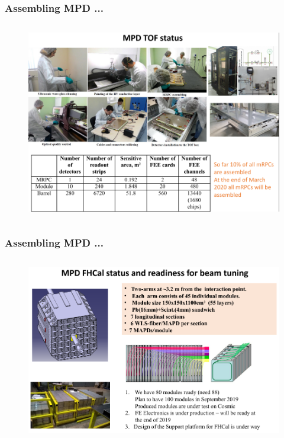 \documentclass[dvipsnames] {beamer}
\begin{document}
\begin{frame}
  \frametitle {\bf \centering Assembling MPD ...}
   \vskip -0.5cm
  \begin{columns}[t]
   \begin{block}{}
       \begin{figure}[H]
         \includegraphics[width=1.\textwidth]{MPD_tofFabrication.png}
       \end{figure}
   \end{block}
  \end{columns}
\end{frame}

\begin{frame}
  \frametitle {\bf \centering Assembling MPD ...}
   \vskip -0.05cm
  \begin{columns}[t]
   \begin{block}{}
       \begin{figure}[H]
         \includegraphics[width=1.\textwidth]{MPD_fhcalFabrication.png}
       \end{figure}
   \end{block}
  \end{columns}
\end{frame}
\end{document}
